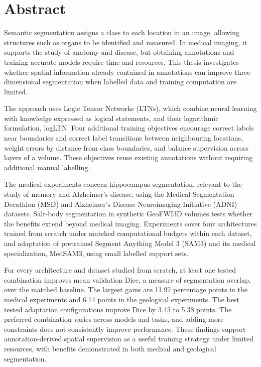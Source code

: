\documentclass[12pt,a4paper]{article}
\begin{document}
\newif\ifthesisincludeabstract
\thesisincludeabstracttrue
\ifthesisincludeabstract
\section*{Abstract}

Semantic segmentation assigns a class to each location in an image,
allowing structures such as organs to be identified and measured. In
medical imaging, it supports the study of anatomy and disease, but
obtaining annotations and training accurate models require time and
resources. This thesis investigates whether spatial information already
contained in annotations can improve three-dimensional segmentation when
labelled data and training computation are limited.

The approach uses Logic Tensor Networks (LTNs), which combine neural
learning with knowledge expressed as logical statements, and their
logarithmic formulation, logLTN. Four additional training objectives
encourage correct labels near boundaries and correct label transitions
between neighbouring locations, weight errors by distance from class
boundaries, and balance supervision across layers of a volume. These
objectives reuse existing annotations without requiring additional manual
labelling.

The medical experiments concern hippocampus segmentation, relevant to the
study of memory and Alzheimer's disease, using the Medical Segmentation
Decathlon (MSD) and Alzheimer's Disease Neuroimaging Initiative (ADNI)
datasets. Salt-body segmentation in synthetic GeoFWI3D volumes tests
whether the benefits extend beyond medical imaging. Experiments cover four
architectures trained from scratch under matched computational budgets
within each dataset, and adaptation of pretrained Segment Anything Model 3
(SAM3) and its medical specialization, MedSAM3, using small labelled
support sets.

For every architecture and dataset studied from scratch, at least one
tested combination improves mean validation Dice, a measure of
segmentation overlap, over the matched baseline. The largest gains are
11.97 percentage points in the medical experiments and 6.14 points in the
geological experiments. The best tested adaptation configurations improve
Dice by 3.45 to 5.38 points. The preferred combination varies across
models and tasks, and adding more constraints does not consistently
improve performance. These findings support annotation-derived spatial
supervision as a useful training strategy under limited resources, with
benefits demonstrated in both medical and geological segmentation.
\end{document}
